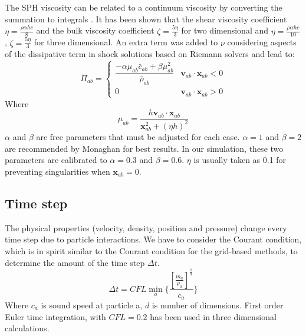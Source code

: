 \documentclass[journal abbreviation, manuscript]{copernicus}
\begin{document}
The SPH viscosity can be related to a continuum viscosity by converting the summation to integrals \citep{monaghan2005smoothed}. It has been shown that the shear viscosity coefficient $\eta = \frac{\rho \alpha h c}{8} $ and the bulk viscosity coefficient $ \zeta = \frac{5 \eta}{3}$ for two dimensional and $\eta = \frac{\rho \alpha h c}{10} $ , $ \zeta = \frac{5 \eta}{3}$ for three dimensional.
An extra term was added to $\nu$ considering aspects of the dissipative term in shock solutions based on Riemann solvers and lead to:
\begin{equation}
\Pi_{ab} = 
\begin{cases} 
      \dfrac{- \alpha \mu_{ab} \bar{c}_{ab} + \beta \mu_{ab}^2} {\bar{\rho}_{ab}} & \textbf{v}_{ab} \cdot \textbf{x}_{ab} < 0\\
      0 & \textbf{v}_{ab} \cdot \textbf{x}_{ab} > 0
\end{cases}
\label{eq:art-vis-shock}
\end{equation}
Where
\begin{equation}
\mu_{ab} = \dfrac{h \textbf{v}_{ab} \cdot \textbf{x}_{ab}}{\textbf{x}_{ab}^2 + (\eta h)^2} 
\end{equation}
$\alpha$ and $\beta$ are free parameters that must be adjusted for each case. $\alpha = 1$ and $\beta = 2$ are  recommended by Monaghan for best results. In our simulation, these two parameters are calibrated to  $\alpha = 0.3$ and $\beta = 0.6$. $\eta$ is usually taken as 0.1 for preventing singularities when $\textbf{x}_{ab} = 0$.
\subsection{Time step}
The physical properties (velocity, density, position and pressure) change every time step due to particle interactions. We have to consider the Courant condition, which is in spirit similar to the Courant condition for the grid-based methods, to determine the amount of the time step $\Delta t$.
\begin{equation}
\Delta t = CFL \min_a \bigg \lbrace \dfrac{[\frac{m_a}{\rho_a}]^{\frac{1}{d}}}{c_a} \bigg \rbrace
\end{equation}
Where $c_a$ is sound speed at particle a, $d$ is number of dimensions. First order Euler time integration, with $CFL = 0.2$ has been used in three dimensional calculations.
\end{document}
